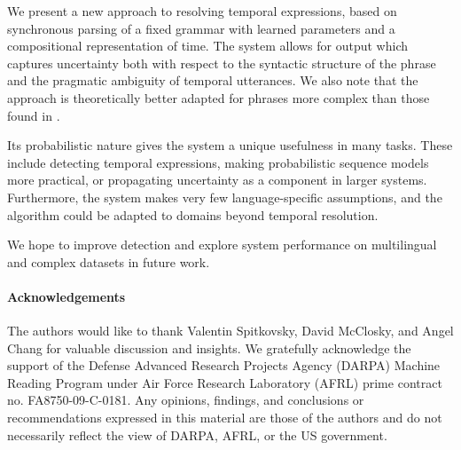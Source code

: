We present a new approach to resolving temporal expressions,
	based on synchronous parsing of a fixed grammar with learned parameters
	and a compositional representation of time.
The system allows for output which captures uncertainty both with respect to 
	the syntactic structure of the phrase and the pragmatic ambiguity of 
	temporal utterances.
We also note that the approach is theoretically better adapted for
	phrases more complex than those found in \tempeval.

Its probabilistic nature gives the system a unique usefulness
	in many tasks.
These include detecting temporal expressions, making probabilistic
	sequence models more practical, or propagating uncertainty as a
	component in larger systems.
Furthermore, the system makes very few language-specific assumptions,
	and the algorithm could be adapted to domains beyond temporal resolution.

We hope to improve detection and explore system performance
	on multilingual and complex datasets in future work.

{\footnotesize
\paragraph{\footnotesize Acknowledgements}
The authors would like to thank Valentin Spitkovsky, David McClosky,
	and Angel Chang for valuable discussion and insights.
We gratefully acknowledge the support of the Defense Advanced 
	Research Projects Agency (DARPA) Machine Reading Program under Air 
	Force Research Laboratory (AFRL) prime contract no. FA8750-09-C-0181. 
Any opinions, findings, and conclusions or recommendations expressed 
	in this material are those of the authors and do not necessarily 
	reflect the view of DARPA, AFRL, or the US government.
}
